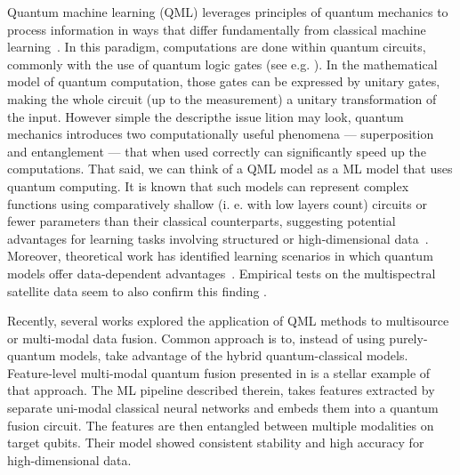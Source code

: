 \documentclass[runningheads]{llncs}
\begin{document}
Quantum machine learning (QML) leverages principles of quantum mechanics to process information in ways that differ
fundamentally from classical machine learning~\cite{biamonteQuantumMachineLearning2017a}. In this paradigm,
computations are done within quantum circuits, commonly with the use of quantum logic gates (see e.g.
\cite{sebastianelli2021circuitbasedhybridquantumneural}). In the mathematical model of quantum computation, those
gates can be expressed by unitary gates, making the whole circuit (up to the measurement) a unitary transformation
of the input. However simple the descripthe issue lition may look, quantum mechanics introduces two computationally useful
phenomena --- superposition and entanglement --- that when used correctly can significantly speed up the
computations. That said, we can think of a QML model as a ML model that uses quantum computing. It is known that
such models can represent complex functions using comparatively shallow (i. e. with low layers count) circuits
or fewer parameters than their classical counterparts, suggesting potential advantages for learning tasks
involving structured or high-dimensional
data~\cite{havlicekSupervisedLearningQuantumenhanced2019,schuldQuantumMachineLearning2019,abbasPowerQuantumNeural2021,GawronPowerOfData}. Moreover,
theoretical work has identified learning scenarios in which quantum models offer data-dependent
advantages~\cite{huangPowerDataQuantum2021a}. Empirical tests on the multispectral satellite data seem to also
confirm this finding \cite{GawronPowerOfData}.




Recently, several works explored the application of QML methods to multisource or multi-modal data fusion.
Common approach is to, instead of using purely-quantum models, take advantage of the hybrid quantum-classical
models. Feature-level multi-modal quantum fusion presented in \cite{wuFeatureEntanglementbasedQuantum2026} is a
stellar example of that approach. The ML pipeline described therein, takes features extracted by separate
uni-modal classical neural networks and embeds them into a quantum fusion circuit. The features are then entangled
between multiple modalities on target qubits. Their model showed consistent stability and high accuracy for
high-dimensional data.
\end{document}
